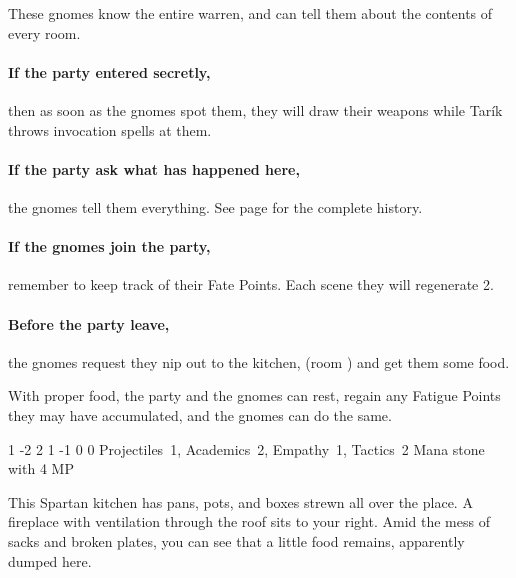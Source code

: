 \begin{multicols}{2}
These gnomes know the entire warren, and can tell them about the contents of every room.

\paragraph{If the party entered secretly,}
then as soon as the gnomes spot them, they will draw their weapons while Tar\'ik throws invocation spells at them.

\paragraph{If the party ask what has happened here,}
the gnomes tell them everything.
See page \pageref{invasionhistory} for the complete history.

\paragraph{If the gnomes join the party,}
remember to keep track of their Fate Points.
Each scene they will regenerate 2.

\setcounter{enc}{\value{list}}
\addtocounter{enc}{1}

\paragraph{Before the party leave,}
the gnomes request they nip out to the kitchen, (room ) and get them some food.

With proper food, the party and the gnomes can rest, regain any Fatigue Points they may have accumulated, and the gnomes can do the same.




{1}%
{-2}%
{{2}%
{1}%
{-1}}%
{0}%
{0}%
{Projectiles~1, Academics~2, Empathy~1, Tactics~2
}%
{Mana stone with 4 MP}%
{\addtocounter{sp}{8}}


\begin{boxtext}

	This Spartan kitchen has pans, pots, and boxes strewn all over the place.
	A fireplace with ventilation through the roof sits to your right.
	Amid the mess of sacks and broken plates, you can see that a little food remains, apparently dumped here.


\end{boxtext}
\end{multicols}
